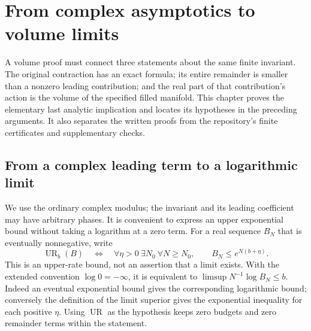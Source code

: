 \chapter{From complex asymptotics to volume limits}
\label{ch:reproduction}

A volume proof must connect three statements about the same finite
invariant. The original contraction has an exact formula; its entire
remainder is smaller than a nonzero leading contribution; and the real
part of that contribution's action is the volume of the specified
filled manifold. This chapter proves the elementary last analytic
implication and locates its hypotheses in the preceding arguments.
It also separates the written proofs from the repository's finite
certificates and supplementary checks.

\section{From a complex leading term to a logarithmic limit}
\label{sec:proof-dependencies}

We use the ordinary complex modulus; the invariant and its leading
coefficient may have arbitrary phases. It is convenient to express an
upper exponential bound without taking a logarithm at a zero term.
For a real sequence $B_N$ that is eventually nonnegative, write
\[
 \operatorname{UR}_b(B)\quad\Longleftrightarrow\quad
 \forall\eta>0\ \exists N_0\ \forall N\ge N_0,\qquad
 B_N\le e^{N(b+\eta)}.
\]
This is an upper-rate bound, not an assertion that a limit exists.
With the extended convention $\log0=-\infty$, it is equivalent to
$\limsup N^{-1}\log B_N\le b$. Indeed an eventual exponential bound
gives the corresponding logarithmic bound; conversely the definition
of the limit superior gives the exponential inequality for each
positive $\eta$. Using $\operatorname{UR}$ as the hypothesis keeps
zero budgets and zero remainder terms within the statement.


